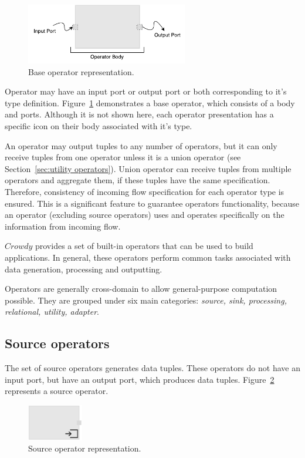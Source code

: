 \begin{figure}[ht]
	\centering
	\includegraphics[height=100px]{figures/basicoperator.pdf}
	\caption{Base operator representation.}
	\label{fig:basic operator}
\end{figure}

Operator may have an input port or output port or both corresponding to it's type 
definition. Figure~\ref{fig:basic operator} demonstrates a base operator, which 
consists of a body and ports. Although it is not shown here, each operator presentation 
has a specific icon on their body associated with it's type.

An operator may output tuples to any number of operators, but it can only receive 
tuples from one operator unless it is a union operator (see Section~\ref{sec:utility operators}). 
Union operator can receive tuples from multiple operators and aggregate them,
if these tuples have the same specification. Therefore, consistency of incoming flow 
specification for each operator type is ensured. 
This is a significant feature to guarantee operators functionality, because an operator 
(excluding source operators) uses and operates specifically on the 
information from incoming flow.

$Crowdy$ provides a set of built-in operators that can be used to build applications. 
In general, these operators perform common tasks associated with data generation, 
processing and outputting.

Operators are generally cross-domain to allow general-purpose 
computation possible. They are grouped under six main categories: 
\textit{source, sink, processing, relational, utility, adapter}.

\subsection{Source operators}
The set of source operators generates data tuples. These operators do not have 
an input port, but have an output port, which produces data tuples. Figure~\ref{fig:source operator} 
represents a source operator.

\begin{figure}[ht]
	\centering
	\includegraphics[height=60px]{figures/SourceOperator.pdf}
	\caption{Source operator representation.}
	\label{fig:source operator}
\end{figure}

